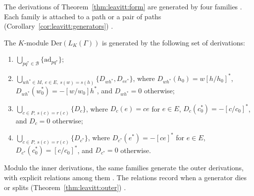The derivations of Theorem~\ref{thm:leavitt:form} are generated by four families
\cite[p.~64]{Lopatkin2019}. Each family is attached to a path or a pair of paths (Corollary~\ref{cor:leavitt:generators})
\cite[p.~64]{Lopatkin2019}.\begin{corollary}\label{cor:leavitt:generators}
The $K$-module $\mathrm{Der}(L_{K}(\Gamma))$ is generated by the following set of
derivations:
\begin{enumerate}[label=(\arabic*)]
\item $\bigcup_{pq^{*}\in\mathcal B}\{\mathrm{ad}_{pq^{*}}\}$;
\item $\bigcup_{wh^{*}\in M,\ e\in E,\ s(w)=s(h)}\{D_{wh^{*}},D_{ee^{*}}\}$, where
$D_{wh^{*}}(h_{0})=w[h/h_{0}]^{*}$, $D_{wh^{*}}(w_{0}^{*})=-[w/w_{0}]h^{*}$, and
$D_{wh^{*}}=0$ otherwise;
\item $\bigcup_{c\in P,\ s(c)=r(c)}\{D_{c}\}$, where $D_{c}(e)=ce$ for $e\in E$,
$D_{c}(c_{0}^{*})=-[c/c_{0}]^{*}$, and $D_{c}=0$ otherwise;
\item $\bigcup_{c\in P,\ s(c)=r(c)}\{D_{c^{*}}\}$, where $D_{c^{*}}(e^{*})=-[ce]^{*}$
for $e\in E$, $D_{c^{*}}(c_{0}^{*})=[c/c_{0}]^{*}$, and $D_{c^{*}}=0$ otherwise.
\end{enumerate}
\end{corollary}

Modulo the inner derivations, the same families generate the outer
derivations, with explicit relations among them \cite[p.~78]{Lopatkin2019}.
The relations record when a generator dies or splits
(Theorem~\ref{thm:leavitt:outer}) \cite[p.~78]{Lopatkin2019}.

